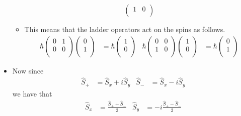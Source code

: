 \documentclass[../notes.tex]{subfiles}
\begin{document}
\begin{itemize}
\begin{itemize}
\begin{equation*}
\begin{pmatrix}
                1 & 0\\
            \end{pmatrix}
        \end{equation*}
        \item This means that the ladder operators act on the spins as follows.
        \begin{align*}
            \hbar
            \begin{pmatrix}
                0 & 1\\
                0 & 0\\
            \end{pmatrix}
            \begin{pmatrix}
                0\\
                1\\
            \end{pmatrix}
            &= \hbar
            \begin{pmatrix}
                1\\
                0\\
            \end{pmatrix}&
            \hbar
            \begin{pmatrix}
                0 & 0\\
                1 & 0\\
            \end{pmatrix}
            \begin{pmatrix}
                1\\
                0\\
            \end{pmatrix}
            &= \hbar
            \begin{pmatrix}
                0\\
                1\\
            \end{pmatrix}
        \end{align*}
    \end{itemize}
    \item Now since
    \begin{align*}
        \hat{S}_+ &= \hat{S}_x+i\hat{S}_y&
        \hat{S}_- &= \hat{S}_x-i\hat{S}_y
    \end{align*}
    we have that
    \begin{align*}
        \hat{S}_x &= \frac{\hat{S}_++\hat{S}_-}{2}&
            \hat{S}_y &= -i\frac{\hat{S}_+-\hat{S}_-}{2}\\

\end{align*}
\end{itemize}
\end{document}
